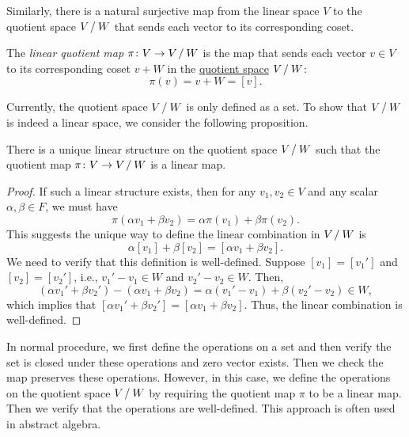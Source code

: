 Similarly, there is a natural surjective map from the linear space $V$ to the quotient space $V \mathbin{/} W$ that sends each vector to its corresponding coset.

\begin{definition}\label{def:quotient_map}
  The \emph{linear quotient map} $\pi \colon V \to V \mathbin{/} W$ is the map that sends each vector $v \in V$ to its corresponding coset $v + W$ in the \hyperref[def:quotient_space]{quotient space} $V \mathbin{/} W$:
  \[
    \pi(v) = v + W = [v].
  \]
\end{definition}

Currently, the quotient space $V \mathbin{/} W$ is only defined as a set. To show that $V \mathbin{/} W$ is indeed a linear space, we consider the following proposition.

\begin{proposition}
  There is a unique linear structure on the quotient space $V \mathbin{/} W$ such that the quotient map $\pi \colon V \to V \mathbin{/} W$ is a linear map.
\end{proposition}
\begin{proof}
  If such a linear structure exists, then for any $v_1, v_2 \in V$ and any scalar $\alpha, \beta \in F$, we must have
  \[
    \pi(\alpha v_1 + \beta v_2) = \alpha \pi(v_1) + \beta \pi(v_2).
  \]
  This suggests the unique way to define the linear combination in $V \mathbin{/} W$ is
  \[
    \alpha [v_1] + \beta [v_2] = [\alpha v_1 + \beta v_2].
  \]
  We need to verify that this definition is well-defined. Suppose $[v_1] = [v_1']$ and $[v_2] = [v_2']$, i.e., $v_1' - v_1 \in W$ and $v_2' - v_2 \in W$. Then,
  \[
    (\alpha v_1' + \beta v_2') - (\alpha v_1 + \beta v_2) = \alpha (v_1' - v_1) + \beta (v_2' - v_2) \in W,
  \]
  which implies that $[\alpha v_1' + \beta v_2'] = [\alpha v_1 + \beta v_2]$. Thus, the linear combination is well-defined.
\end{proof}

\begin{remark}
  In normal procedure, we first define the operations on a set and then verify the set is closed under these operations and zero vector exists. Then we check the map preserves these operations. However, in this case, we define the operations on the quotient space $V \mathbin{/} W$ by requiring the quotient map $\pi$ to be a linear map. Then we verify that the operations are well-defined. This approach is often used in abstract algebra.
\end{remark}

